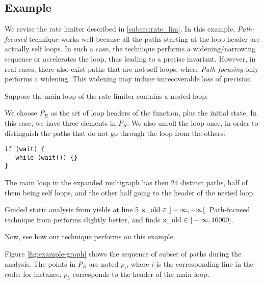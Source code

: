 \documentclass[preprint]{sigplanconf}
\begin{document}
\subsection{Example}

We revise the rate limiter described in \ref{subsec:rate_lim}. In this example,
\emph{Path-focused} technique works well because all the paths starting at the
loop header are actually self loops. In such a case, the technique performs a
widening/narrowing sequence or accelerates the loop, thus leading to a precise
invariant. However, in real cases, there also exist paths that are not
self loops, where \emph{Path-focusing} only performs a widening. 
This widening may induce unrecoverable loss of precision.

Suppose the main loop of the rate limiter contains a nested loop:


We choose $P_R$ as the set of loop headers of the function, plus the initial
state. In this case, we have three elements in $P_R$.
We also unroll the loop once, in order to distinguish the paths that do not go
through the loop from the others:
\begin{lstlisting}[numbers=none]
if (wait) {
   while (wait()) {}
}
\end{lstlisting}

The main loop in the expanded multigraph has then 24 distinct paths, half of
them being self loops, and the other half going to the header of the nested loop.

Guided static analysis from \citet{DBLP:conf/sas/GopanR07} yields at line 5
$\lstinline|x_old| \in~]-\infty,+\infty[$.
Path-focused technique from \citet{Monniaux_Gonnord_SAS11} performs slightly
better, and finds $\lstinline|x_old| \in~]-\infty,10000]$.

Now, see how our technique performs on this example.

Figure \ref{fig:example-graph} shows the sequence of subset of paths during the
analysis. The points in $P_R$ are noted $p_i$, where $i$ is the corresponding
line in the code: for instance, $p_5$ corresponds to the header of the main
loop.
\end{document}
